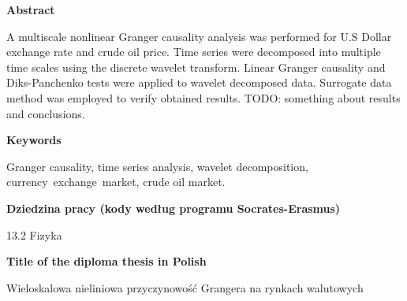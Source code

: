 \newpage
\begin{center}
\textbf{Abstract}
\end{center}

A multiscale nonlinear Granger causality analysis was performed for U.S Dollar exchange rate and crude oil price.
Time series were decomposed into multiple time scales using the discrete wavelet transform.
Linear Granger causality and Diks-Panchenko tests were applied to wavelet decomposed data.
Surrogate data method was employed to verify obtained results.
TODO: something about results and conclusions.
\vspace{2.5cm}
\begin{center}

\textbf{Keywords}\vspace{0.3cm}

Granger causality, time series analysis, wavelet decomposition, \mbox{currency exchange market}, crude oil market.\\
\vspace{2.5cm}

\textbf{Dziedzina pracy (kody według programu Socrates-Erasmus)}\vspace{0.3cm}

13.2 Fizyka\\
\vspace{2.5cm}

\textbf{Title of the diploma thesis in Polish}\vspace{0.3cm}

Wieloskalowa nieliniowa przyczynowość Grangera na rynkach walutowych
\end{center}

